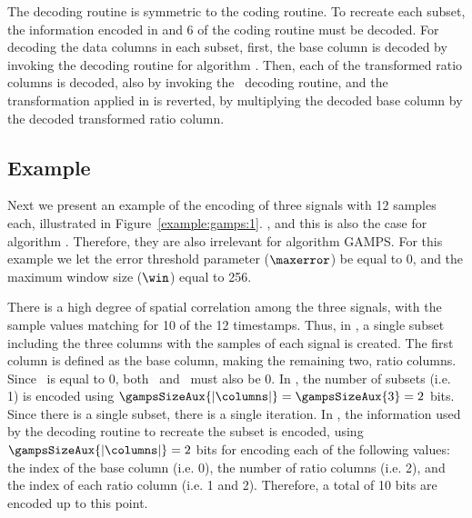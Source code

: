 The decoding routine is symmetric to the coding routine. To recreate each subset, the information encoded in  and 6 of the coding routine must be decoded. For decoding the data columns in each subset, first, the base column is decoded by invoking the decoding routine for algorithm \apcaF. Then, each of the transformed ratio columns is decoded, also by invoking the \apcaF\ decoding routine, and the transformation applied in  is reverted, by multiplying the decoded base column by the decoded transformed ratio column.





\vspace{-5pt}
\subsection{Example}
\label{algo:gamps:example}


\vspace{-5pt}
Next we present an example of the encoding of three signals with 12 samples each, illustrated in Figure~\ref{example:gamps:1}. , and this is also the case for algorithm \apcaF. Therefore, they are also irrelevant for algorithm GAMPS. For this example we let the error threshold parameter ($\maxerror$) be equal to 0, and the maximum window size ($\win$) equal to 256.


\vspace{-5pt}


There is a high degree of spatial correlation among the three signals, with the sample values matching for 10 of the 12 timestamps. Thus, in , a single subset including the three columns with the samples of each signal is created. The first column is defined as the base column, making the remaining two, ratio columns. Since \maxerror\ is equal to 0, both \epsilonB\ and \epsilonR\ must also be 0. In , the number of subsets (i.e. 1) is encoded using $\gampsSizeAux{|\columns|}=\gampsSizeAux{3}=2$ bits. Since there is a single subset, there is a single iteration. In , the information used by the decoding routine to recreate the subset is encoded, using $\gampsSizeAux{|\columns|}=2$ bits for encoding each of the following values: the index of the base column (i.e. 0), the number of ratio columns (i.e. 2), and the index of each ratio column (i.e. 1 and 2). Therefore, a total of 10 bits are encoded up to this point.


